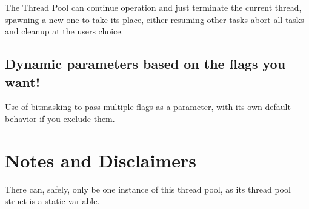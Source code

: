 The Thread Pool can continue operation and just terminate the current thread, spawning a new one to take it\textquotesingle{}s place, either resuming other tasks abort all tasks and cleanup at the user\textquotesingle{}s choice.\hypertarget{index_parameters}{}\subsection{Dynamic parameters based on the flags you want!}\label{index_parameters}
Use of bitmasking to pass multiple flags as a parameter, with it\textquotesingle{}s own default behavior if you exclude them.\hypertarget{index_notes}{}\section{Notes and Disclaimers}\label{index_notes}
There can, safely, only be one instance of this thread pool, as it\textquotesingle{}s thread pool struct is a static variable. 